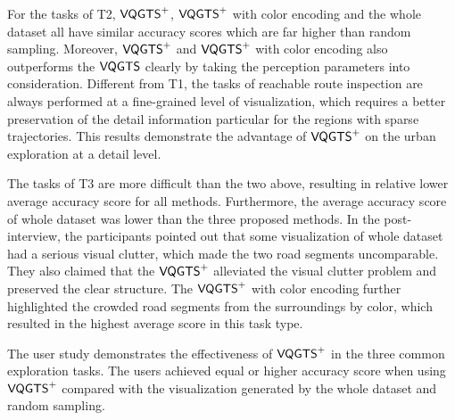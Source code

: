 For the tasks of T2, $\mathsf{VQGTS}^{+}$, $\mathsf{VQGTS}^{+}$ with color encoding and the whole dataset all have similar accuracy scores which are far higher than random sampling. Moreover, $\mathsf{VQGTS}^{+}$ and $\mathsf{VQGTS}^{+}$ with color encoding also outperforms the $\mathsf{VQGTS}$ clearly by taking the perception parameters into consideration. Different from T1, the tasks of reachable route inspection are always performed at a fine-grained level of visualization, which requires a better preservation of the detail information particular for the regions with sparse trajectories. This results demonstrate the advantage of $\mathsf{VQGTS}^{+}$ on the urban exploration at a detail level.
 
 
The tasks of T3 are more difficult than the two above, resulting in relative lower average accuracy score for all methods. Furthermore, the average accuracy score of whole dataset was lower than the three proposed methods. In the post-interview, the participants pointed out that some visualization of whole dataset had a serious visual clutter, which made the two road segments uncomparable. They also claimed that the $\mathsf{VQGTS}^{+}$ alleviated the visual clutter problem and preserved the clear structure. The $\mathsf{VQGTS}^{+}$ with color encoding further highlighted the crowded road segments from the surroundings by color, which resulted in the highest average score in this task type.

The user study demonstrates the effectiveness of $\mathsf{VQGTS}^{+}$ in the three common exploration tasks. The users achieved equal or higher accuracy score when using $\mathsf{VQGTS}^{+}$ compared with the visualization generated by the whole dataset and random sampling. 



